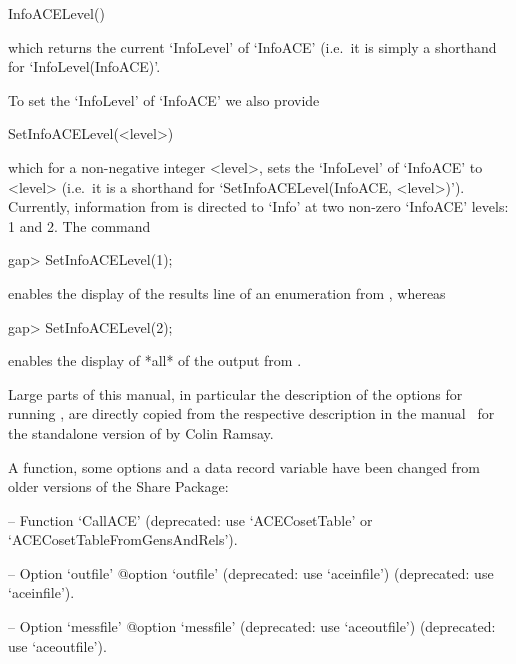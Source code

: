 \>InfoACELevel()

which returns the current `InfoLevel' of `InfoACE' (i.e.~it is  simply
a shorthand for `InfoLevel(InfoACE)'.

To set the `InfoLevel' of `InfoACE' we also provide

\>SetInfoACELevel(<level>)

which for a non-negative integer  <level>,  sets  the  `InfoLevel'  of
`InfoACE'    to    <level>    (i.e.~it    is    a    shorthand     for
`SetInfoACELevel(InfoACE,  <level>)').  Currently,  information   from
{\ACE} is directed to `Info' at two non-zero `InfoACE' levels:  1  and
2. The command

\begintt
gap> SetInfoACELevel(1);
\endtt

enables the display of the results line of an enumeration from {\ACE},
whereas

\begintt
gap> SetInfoACELevel(2);
\endtt

enables the display of *all* of the output from {\ACE}.


Large parts of this manual,  in  particular  the  description  of  the
options for running {\ACE}, are directly copied  from  the  respective
description in the manual~\cite{Ram99} for the standalone  version  of
{\ACE} by Colin Ramsay.


A function, some options and a data record variable have been changed
from older versions of the {\ACE} Share Package:

\beginlist

\item{--} Function   `CallACE'{\undoquotes{}}  (deprecated:  use
`ACECosetTable' or `ACECosetTableFromGensAndRels').

\item{--} Option    `outfile'{\undoquotes{}
{@option `outfile' (deprecated: use  `aceinfile')}}  (deprecated:  use
`aceinfile').

\item{--} Option    `messfile'{\undoquotes{}
{@option `messfile' (deprecated: use `aceoutfile')}} (deprecated:  use
`aceoutfile').

